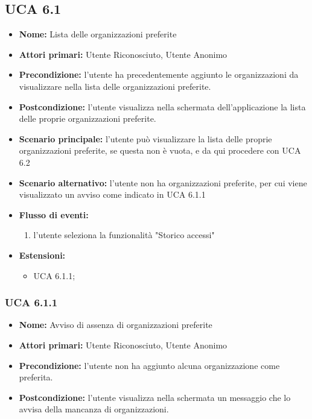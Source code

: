 \subsection{UCA 6.1}
\begin{itemize}
    \item \textbf{Nome:} Lista delle organizzazioni preferite
    \item \textbf{Attori primari:} Utente Riconosciuto, Utente Anonimo
    \item \textbf{Precondizione:} l’utente ha precedentemente aggiunto le organizzazioni da visualizzare nella lista delle organizzazioni preferite.
    \item \textbf{Postcondizione:} l’utente visualizza nella schermata dell’applicazione la lista delle proprie organizzazioni preferite. 
    \item \textbf{Scenario principale:} l'utente può visualizzare la lista delle proprie organizzazioni preferite, se questa non è vuota, e da qui procedere con UCA 6.2
    \item \textbf{Scenario alternativo:} l'utente non ha organizzazioni preferite, per cui viene visualizzato un avviso come indicato in UCA 6.1.1
    \item \textbf{Flusso di eventi:}
    \begin{enumerate}
        \item l'utente seleziona la funzionalità "Storico accessi"
    \end{enumerate}
    \item \textbf{Estensioni:}
    \begin{itemize}
        \item UCA 6.1.1;
    \end{itemize}
\end{itemize}

\subsubsection{UCA 6.1.1}
\begin{itemize}
    \item \textbf{Nome:} Avviso di assenza di organizzazioni preferite
    \item \textbf{Attori primari:} Utente Riconosciuto, Utente Anonimo
    \item \textbf{Precondizione:} l'utente non ha aggiunto alcuna organizzazione come preferita.
    \item \textbf{Postcondizione:} l'utente visualizza nella schermata un messaggio che lo avvisa della mancanza di organizzazioni.
\end{itemize}

